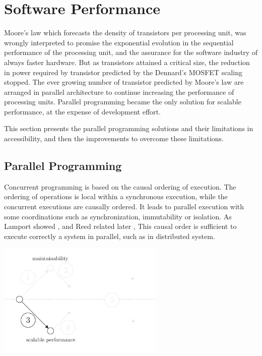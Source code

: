 \section{Software Performance} \label{chapter3:software-performance}



Moore's law \cite{Moore1965} which forecasts the density of transistors per processing unit, was wrongly interpreted to promise the exponential evolution in the sequential performance of the processing unit, and the assurance for the software industry of always faster hardware.
But as transistors attained a critical size, the reduction in power required by transistor predicted by the Dennard's MOSFET scaling \cite{Dennard2007} stopped.
The ever growing number of transistor predicted by Moore's law are arranged in parallel architecture to continue increasing the performance of processing units.
Parallel programming became the only solution for scalable performance, at the expense of development effort.

This section presents the parallel programming solutions and their limitations in accessibility, and then the improvements to overcome these limitations.

\subsection{Parallel Programming}


Concurrent programming is based on the causal ordering of execution.
The ordering of operations is local within a synchronous execution, while the concurrent executions are causally ordered.
It leads to parallel execution with some coordinations such as synchronization, immutability or isolation.
As Lamport showed \cite{Lamport1978}, and Reed related later \cite{Reed2012}, This causal order is sufficient to execute correctly a system in parallel, such as in distributed system.

\begin{center}
\includegraphics[width=0.6\textwidth]{../ressources/state-of-the-art-3.pdf}
\end{center}

